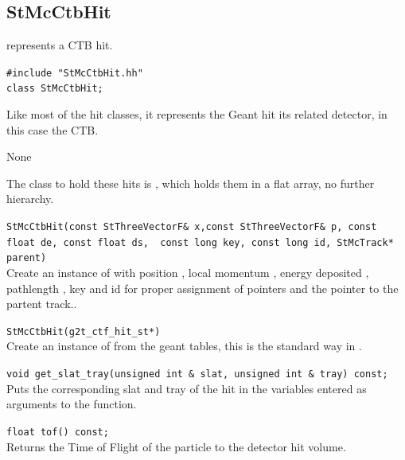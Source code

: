 \subsection{StMcCtbHit}
\label{sec:StMcCtbHit}
\begin{Entry}
\item[Summary]
     represents a CTB hit.
\item[Synopsis]
    \verb+#include "StMcCtbHit.hh"+\\
    \verb+class StMcCtbHit;+\\

\item[Description]
Like most of the hit classes, it represents the Geant hit its related detector, in
this case the CTB.
\item[Persistence]
    None

\item[Related Classes]
The class to hold these hits is , which holds them in a flat
array, no further hierarchy.
\item[Public\\ Constructors]
    \verb+StMcCtbHit(const StThreeVectorF& x,const StThreeVectorF& p, const float de, const float ds,  const long key, const long id, StMcTrack* parent)+\\
    Create an instance of  with position ,
    local momentum , energy deposited , pathlength ,
    key and id for proper assignment of pointers and the pointer to the partent track..

    \verb+StMcCtbHit(g2t_ctf_hit_st*)+\\
    Create an instance of  from the geant tables, this is the
    standard way in .

\item[Public Member\\ Functions]
    \verb+void get_slat_tray(unsigned int & slat, unsigned int & tray) const;+\\
    Puts the corresponding slat and tray of the hit in the variables entered as arguments to the function.

    \verb+float tof() const;+\\
    Returns the Time of Flight of the particle to the detector hit volume.

\end{Entry}
%
%
%

